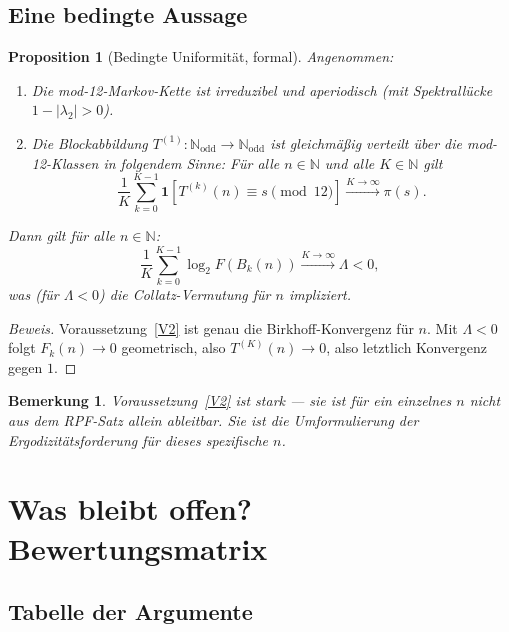\documentclass[12pt,a4paper]{article}
\newtheorem{proposition}[definition]{Proposition}
\newtheorem{bemerkung}[definition]{Bemerkung}
\newenvironment{beweis}{\begin{proof}[Beweis]}{\end{proof}}
\newcommand{\N}{\mathbb{N}}
\begin{document}
\subsection{Eine bedingte Aussage}

\begin{proposition}[Bedingte Uniformität, formal]
\label{prop:bedingt}
Angenommen:
\begin{enumerate}[label=(V\arabic*)]
  \item\label{V1} Die mod-12-Markov-Kette ist irreduzibel und aperiodisch
    (mit Spektrallücke $1 - |\lambda_2| > 0$).
  \item\label{V2} Die Blockabbildung $T^{(1)}: \N_{\mathrm{odd}} \to \N_{\mathrm{odd}}$
    ist gleichmäßig verteilt über die mod-12-Klassen in folgendem Sinne:
    Für alle $n \in \N$ und alle $K \in \N$ gilt
    \[
      \frac{1}{K}\sum_{k=0}^{K-1}\mathbf{1}[T^{(k)}(n) \equiv s \pmod{12}]
      \xrightarrow{K\to\infty} \pi(s).
    \]
\end{enumerate}
Dann gilt für alle $n \in \N$:
\[
  \frac{1}{K}\sum_{k=0}^{K-1}\log_2 F(B_k(n)) \xrightarrow{K\to\infty} \Lambda < 0,
\]
was (für $\Lambda < 0$) die Collatz-Vermutung für $n$ impliziert.
\end{proposition}

\begin{beweis}
Voraussetzung~\ref{V2} ist genau die Birkhoff-Konvergenz für $n$.
Mit $\Lambda < 0$ folgt $F_k(n) \to 0$ geometrisch, also
$T^{(K)}(n) \to 0$, also letztlich Konvergenz gegen $1$.
\end{beweis}

\begin{bemerkung}
Voraussetzung~\ref{V2} ist stark --- sie ist für ein \emph{einzelnes} $n$
nicht aus dem RPF-Satz allein ableitbar. Sie ist die Umformulierung
der Ergodizitätsforderung für dieses spezifische $n$.
\end{bemerkung}

\section{Was bleibt offen? Bewertungsmatrix}
\label{sec:offen}

\subsection{Tabelle der Argumente}
\end{document}
